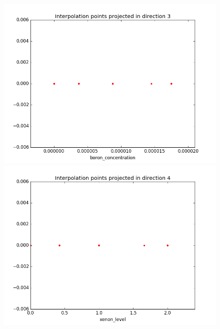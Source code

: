 \begin{figure}[h]
   \begin{minipage}[b]{0.5\linewidth}
      \centering \includegraphics[scale=0.25]{images/MOX/interpolation_points_3_macro_totale0.png}
   \end{minipage}
	 \begin{minipage}[b]{0.5\linewidth}
      \centering \includegraphics[scale=0.25]{images/MOX/interpolation_points_4_macro_totale0.png}
   \end{minipage}
\end{figure}
\newpage
